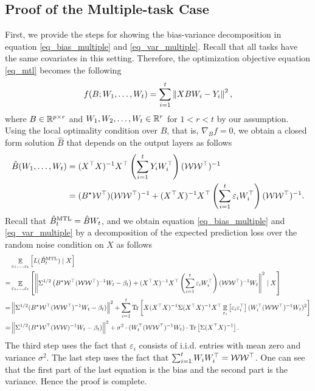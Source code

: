 \subsection{Proof of the Multiple-task Case}\label{app_proof_many_tasks}

	First, we provide the steps for showing the bias-variance decomposition in equation \eqref{eq_bias_multiple} and \eqref{eq_var_multiple}.
	Recall that all tasks have the same covariates in this setting.
	Therefore, the optimization objective equation \eqref{eq_mtl} becomes the following
	\begin{align}
		f(B; W_1, \dots, W_t) = \sum_{i=1}^t \left\| X B W_i - Y_i \right\|^2, \label{eq_mtl_same_cov}
	\end{align}
	where $B \in \mathbb{R}^{p \times r}$ and $W_1, W_2, \dots, W_t \in \mathbb{R}^r$ for $1 < r < t$ by our assumption.
	Using the local optimality condition over $B$, that is, $\nabla_B f = 0$, we obtain a closed form solution $\hat{B}$ that depends on the output layers as follows
	\begin{align*}
		\hat{B}(W_1, \dots, W_t) &= (X^{\top}X)^{-1} X^{\top} \left({\sum_{i=1}^t Y_i W_i^{\top}}\right) (\mathcal W  \mathcal W^{\top})^{-1} \\
		&= (B^\star \mathcal W ^{\top}) (\mathcal W \mathcal W ^{\top})^{-1} + (X^{\top}X)^{-1}X^{\top}   \left({\sum_{i=1}^t \varepsilon_i W_i^{\top}}\right) (\mathcal W \mathcal W^{\top})^{-1}.
	\end{align*}
	Recall that $\hat{B}_t^{\textup{MTL}} = \hat{B} W_t$, and we obtain equation \eqref{eq_bias_multiple} and \eqref{eq_var_multiple} by a decomposition of the expected prediction loss over the random noise condition on $X$ as follows
	\begin{align}
		 & \mathop{\mathbb{E}}_{\varepsilon_1, \dots, \varepsilon_t}\left[ L(\hat{B}_t^{\textup{MTL}}) \mid X \right] \nonumber \\
		=& \mathop{\mathbb{E}}_{\varepsilon_1, \dots, \varepsilon_t}\left[ \left\| \Sigma^{1/2} \left({B^{\star} {\mathcal W}^{\top} ({\mathcal W} {\mathcal W}^{\top})^{-1}W_t - \beta_t}\right) + (X^{\top}X)^{-1} X^{\top} \left({\sum_{i=1}^t \varepsilon_i W_i^{\top}}\right) ({\mathcal W} {\mathcal W}^{\top})^{-1} W_t \right\|^2 \mid X \right] \nonumber \\
		=& \left\| \Sigma^{1/2} (B^{\star} {\mathcal W}^{\top} ({\mathcal W} {\mathcal W}^{\top})^{-1} W_t - \beta_t) \right\|^2
		+ \sum_{i=1}^t \operatorname{Tr}\left[X (X^{\top}X)^{-1}\Sigma (X^{\top}X)^{-1}X^{\top} \mathop{\mathbb{E}}_{\varepsilon_i}\left[ \varepsilon_i \varepsilon_i^{\top} \right] (W_i^{\top} ({\mathcal W} {\mathcal W}^{\top})^{-1} W_t)^2\right] \nonumber \\
		=& \left\| \Sigma^{1/2}(B^{\star} {\mathcal W}^{\top} ({\mathcal W} {\mathcal W})^{-1} W_t - \beta_t) \right\|^2
		+ \sigma^2 \cdot (W_t^{\top} ({\mathcal W} {\mathcal W}^{\top})^{-1} W_t) \cdot \operatorname{Tr}\left[\Sigma (X^{\top}X)^{-1}\right]. \label{eq_ex_pred}
	\end{align}
	The third step uses the fact that $\varepsilon_i$ consists of i.i.d. entries with mean zero and variance $\sigma^2$.
	The last step uses the fact that $\sum_{i=1}^t W_i W_i^{\top} = {\mathcal W} {\mathcal W}^{\top}$.
	One can see that the first part of the last equation is the bias and the second part is the variance.
	Hence the proof is complete.

